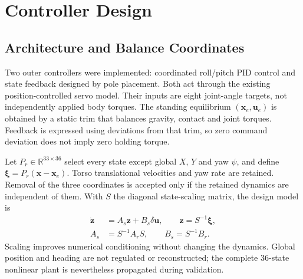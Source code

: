 \documentclass[conference,a4paper]{IEEEtran}
\begin{document}
\section{Controller Design}
\label{sec:controller_design}

\providecommand{\mdfigure}[4]{%
\begin{figure}[!htbp]\centering
\fbox{\begin{minipage}[c][#1][c]{0.90\columnwidth}
\centering\small\textbf{Figure placeholder}\\[3pt]#2
\end{minipage}}
\caption{#3}\label{#4}\end{figure}}

\subsection{Architecture and Balance Coordinates}
Two outer controllers were implemented: coordinated roll/pitch PID control
and state feedback designed by pole placement. Both act through the existing
position-controlled servo model. Their inputs are eight joint-angle targets,
not independently applied body torques. The standing equilibrium
$(\mathbf{x}_e,\mathbf{u}_e)$ is obtained by a static trim that balances gravity,
contact and joint torques. Feedback is expressed using deviations from that
trim, so zero command deviation does not imply zero holding torque.

Let $P_r\in\mathbb{R}^{33\times36}$ select every state except global $X$, $Y$
and yaw $\psi$, and define $\boldsymbol\xi=P_r(\mathbf{x}-\mathbf{x}_e)$.
Torso translational velocities and yaw rate are retained. Removal of the
three coordinates is accepted only if the retained dynamics are independent
of them. With $S$ the diagonal state-scaling matrix, the design model is
\begin{align}
 \dot{\mathbf z}&=A_s\mathbf z+B_s\delta\mathbf u,
 \qquad \mathbf z=S^{-1}\boldsymbol\xi,\\
 A_s&=S^{-1}A_rS,\qquad B_s=S^{-1}B_r.
\end{align}
Scaling improves numerical conditioning without changing the dynamics.
Global position and heading are not regulated or reconstructed; the complete
36-state nonlinear plant is nevertheless propagated during validation.
\end{document}

